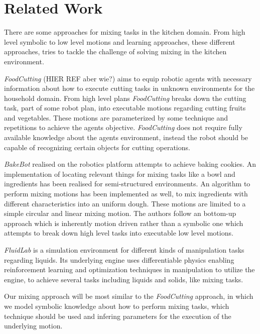 \chapter{Related Work}
\label{chap:Related_work}
There are some approaches for mixing tasks in the kitchen domain. From high level symbolic to low level motions and 
learning approaches, these different approaches, tries to tackle the challenge of solving mixing in the kitchen environment.

\textit{FoodCutting} (HIER REF aber wie?) aims to equip robotic agents with necessary information about how to 
execute  cutting tasks in unknown environments for the household domain. From high level plans \textit{FoodCutting} breaks down 
the cutting task, part of some robot plan, into executable motions regarding cutting fruits and vegetables. These motions are parameterized 
by some technique and repetitions to achieve the agents objective. 
\textit{FoodCutting} does not require fully available knowledge
about the agents environment, instead the robot should be capable of recognizing certain objects for cutting 
operations. 

\textit{BakeBot} \cite{Bollini2011BakebotBC} realised on the \textit{}  robotics platform attempts to achieve baking cookies. An implementation of locating relevant things for mixing tasks
like a bowl and ingredients has been realised for semi-structured environments. An algorithm to perform mixing motions has been implemented as well, to mix 
ingredients with different characteristics into an uniform dough. These motions are limited to a simple circular and linear mixing motion.
The authors follow an bottom-up approach which is inherently motion driven rather than a
symbolic one which attempts to break down high level tasks into executable low level motions. 

\textit{FluidLab} \cite{xian2023fluidlab} is a simulation environment for different kinds of manipulation tasks regarding liquids. Its underlying engine uses differentiable physics 
enabling reinforcement learning and optimization techniques in manipulation to utilize the engine, to achieve several tasks 
including liquids and solids, like mixing tasks. 

Our mixing approach will be most similar to the \textit{FoodCutting} approach, in which we model symbolic knowledge about how to perform
mixing tasks, which technique should be used and infering parameters for the execution of the underlying motion.

